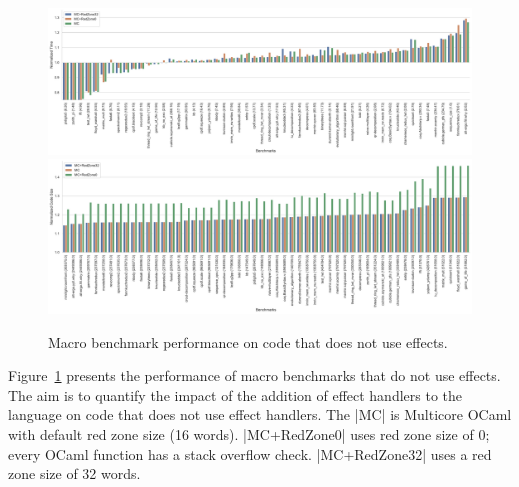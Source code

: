 \documentclass[sigplan,10pt,review,anonymous]{acmart}\settopmatter{printfolios=true,printccs=false,printacmref=false}
\begin{document}
\begin{figure}
	\begin{minipage}{\linewidth}
	\includegraphics[width=\linewidth]{sandmark-notebook/sandmark_time}
	\includegraphics[width=\linewidth]{sandmark-notebook/sandmark_codesize}
	\end{minipage}
	\caption{Macro benchmark performance on code that does not use effects.}
	\label{res:macro}
\end{figure}

Figure~\ref{res:macro} presents the performance of macro benchmarks that do not
use effects. The aim is to quantify the impact of the addition of effect
handlers to the language on code that does not use effect handlers. The |MC| is
Multicore OCaml with default red zone size (16 words). |MC+RedZone0| uses red
zone size of 0; every OCaml function has a stack overflow check. |MC+RedZone32|
uses a red zone size of 32 words.
\end{document}
